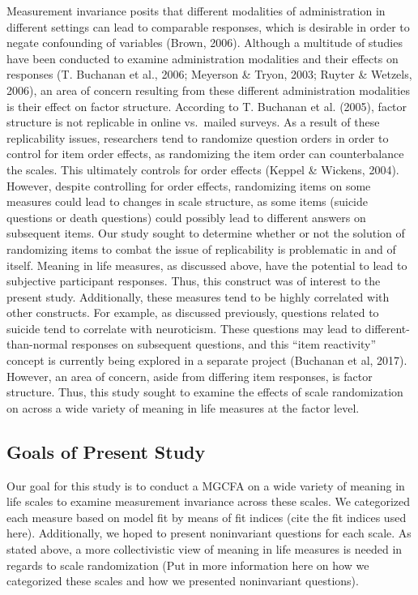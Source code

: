 \documentclass[man,draftall]{apa6}
\begin{document}
Measurement invariance posits that different modalities of administration in different settings can lead to comparable responses, which is desirable in order to negate confounding of variables (Brown, 2006). Although a multitude of studies have been conducted to examine administration modalities and their effects on responses (T. Buchanan et al., 2006; Meyerson \& Tryon, 2003; Ruyter \& Wetzels, 2006), an area of concern resulting from these different administration modalities is their effect on factor structure. According to T. Buchanan et al. (2005), factor structure is not replicable in online vs.~mailed surveys. As a result of these replicability issues, researchers tend to randomize question orders in order to control for item order effects, as randomizing the item order can counterbalance the scales. This ultimately controls for order effects (Keppel \& Wickens, 2004). However, despite controlling for order effects, randomizing items on some measures could lead to changes in scale structure, as some items (suicide questions or death questions) could possibly lead to different answers on subsequent items. Our study sought to determine whether or not the solution of randomizing items to combat the issue of replicability is problematic in and of itself. Meaning in life measures, as discussed above, have the potential to lead to subjective participant responses. Thus, this construct was of interest to the present study. Additionally, these measures tend to be highly correlated with other constructs. For example, as discussed previously, questions related to suicide tend to correlate with neuroticism. These questions may lead to different-than-normal responses on subsequent questions, and this \enquote{item reactivity} concept is currently being explored in a separate project (Buchanan et al, 2017). However, an area of concern, aside from differing item responses, is factor structure. Thus, this study sought to examine the effects of scale randomization on across a wide variety of meaning in life measures at the factor level.

\hypertarget{goals-of-present-study}{%
\subsection{Goals of Present Study}\label{goals-of-present-study}}

Our goal for this study is to conduct a MGCFA on a wide variety of meaning in life scales to examine measurement invariance across these scales. We categorized each measure based on model fit by means of fit indices (cite the fit indices used here). Additionally, we hoped to present noninvariant questions for each scale. As stated above, a more collectivistic view of meaning in life measures is needed in regards to scale randomization (Put in more information here on how we categorized these scales and how we presented noninvariant questions).
\end{document}
